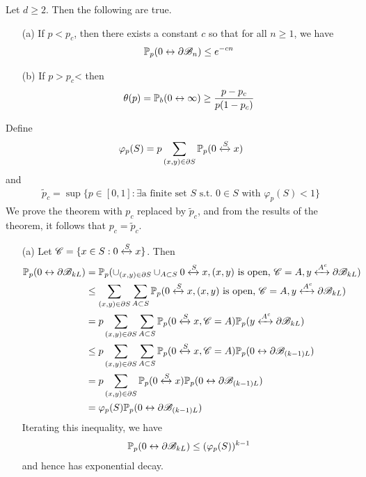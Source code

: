 \documentclass[10pt,a4paper]{report}
\newenvironment{proof}
{\begin{changemargin}{1cm}{0.5cm} 
	}%
	{\end{changemargin}
}
\begin{document}
 Let $d\geq 2$. Then the following are true.
\begin{itemize}
\item[(a)] If $p<p_c$, then there exists a constant $c$ so that for all $n\geq 1$, we have
\begin{align*}
\mathbb{P}_p(0\leftrightarrow \partial \mathscr{B}_n) \leq e^{-cn}
\end{align*}

\item[(b)] If $p>p_c$< then
\begin{align*}
\theta(p) = \mathbb{P}_b(0\leftrightarrow \infty) \geq \frac{p-p_c}{p(1-p_c)}
\end{align*}
\end{itemize}
\begin{proof}
\pf Define
\begin{align*}
\varphi_p(S) = p\sum_{(x,y)\in \partial S} \mathbb{P}_p(0 \xleftrightarrow[]{S} x)
\end{align*}
and
\begin{align*}
\tilde{p}_c = \sup\{p\in [0,1]:\exists \text{a finite set }S\text{ s.t. } 0\in S\text{ with }\varphi_p(S)<1 \}
\end{align*}
We prove the theorem with $p_c$ replaced by $\tilde{p}_c$, and from the results of the theorem, it follows that $p_c = \tilde{p}_c$. 
\s

\begin{itemize}
\item[(a)] Let $\mathscr{C} = \{ x\in S : 0 \xleftrightarrow[]{S} x \}$. Then
\begin{align*}
\mathbb{P}_p(0\leftrightarrow \partial \mathscr{B}_{kL}) &= \mathbb{P}_p(\cup_{(x,y)\in \partial S} \cup_{A \subset S} 0 \xleftrightarrow[]{S} x, (x,y)\text{ is open, }\mathscr{C}=A,y \xleftrightarrow[]{A^c} \partial \mathscr{B}_{kL} ) \\
&\leq \sum_{(x,y)\in \partial S} \sum_{A \subset S} \mathbb{P}_p(0 \xleftrightarrow[]{S} x, (x,y)\text{ is open, }\mathscr{C}=A,y \xleftrightarrow[]{A^c} \partial \mathscr{B}_{kL}) \\
&= p \sum_{(x,y)\in \partial S} \sum_{A \subset S} \mathbb{P}_p(0 \xleftrightarrow[]{S} x, \mathscr{C}=A) \mathbb{P}_p(y \xleftrightarrow[]{A^c} \partial \mathscr{B}_{kL}) \\
&\leq p \sum_{(x,y)\in \partial S} \sum_{A \subset S} \mathbb{P}_p(0 \xleftrightarrow[]{S} x, \mathscr{C}=A) \mathbb{P}_p(0 \leftrightarrow \partial \mathscr{B}_{(k-1)L}) \\
&= p \sum_{(x,y)\in \partial S}  \mathbb{P}_p(0 \xleftrightarrow[]{S} x) \mathbb{P}_p(0 \leftrightarrow \partial \mathscr{B}_{(k-1)L}) \\
&= \varphi_p(S) \mathbb{P}_p(0\leftrightarrow \partial \mathscr{B}_{(k-1)L})
\end{align*}
Iterating this inequality, we have
\begin{align*}
\mathbb{P}_p(0\leftrightarrow \partial \mathscr{B}_{kL})\leq (\varphi_p(S))^{k-1}
\end{align*}
and hence has exponential decay.


\end{itemize}
\end{proof}
\end{document}
